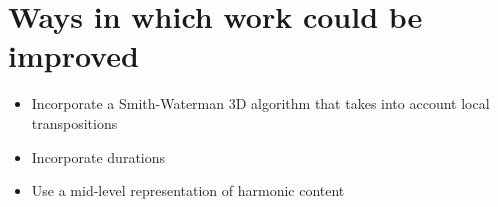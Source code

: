 \section{Ways in which work could be improved}

\begin{itemize}
\item Incorporate a Smith-Waterman 3D algorithm that takes into account local transpositions \cite{allali2007local} \cite{hanna2008improvements}
\item Incorporate durations
\item Use a mid-level representation of harmonic content \cite{BelloEtAl_2005_ARobuMidRepr}
\end{itemize}